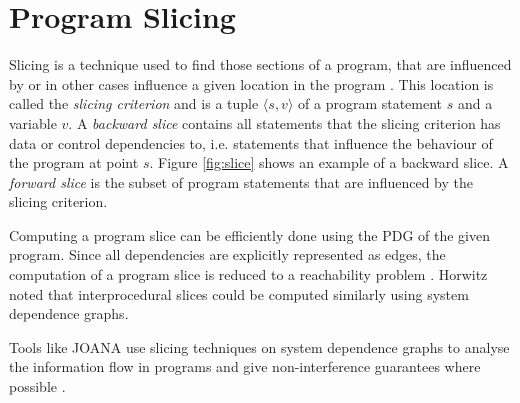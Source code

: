 \section{Program Slicing}


Slicing is a technique used to find those sections of a program, that are influenced by or in other cases influence a given location in the program \cite{weiser81}.
This location is called the \emph{slicing criterion} and is a tuple $\langle s, v \rangle$ of a program statement $s$ and a variable $v$.
A \emph{backward slice} contains all statements that the slicing criterion has data or control dependencies to, i.e. statements that influence the behaviour of the program at point $s$. Figure \ref{fig:slice} shows an example of a backward slice.
A \emph{forward slice} is the subset of program statements that are influenced by the slicing criterion.

Computing a program slice can be efficiently done using the PDG of the given program. Since all dependencies are explicitly represented as edges, the computation of a program slice is reduced to a reachability problem \cite{ottenstein84}. Horwitz \cite{horwitz88sdg} noted that interprocedural slices could be computed similarly using system dependence graphs.

Tools like JOANA use slicing techniques on system dependence graphs to analyse the information flow in programs and give non-interference guarantees where possible \cite{hammer09}.

